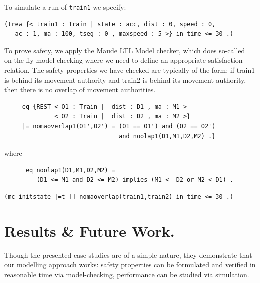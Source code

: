 \documentclass[runningheads,a4paper]{llncs}
\begin{document}
To simulate a run of \texttt{train1} we specify:

\begin{verbatim}
(trew {< train1 : Train | state : acc, dist : 0, speed : 0, 
   ac : 1, ma : 100, tseg : 0 , maxspeed : 5 >} in time <= 30 .)
\end{verbatim}

To prove safety, we apply the Maude LTL Model checker, which does so-called 
on-the-fly model checking where we need to define an appropriate 
satisfaction relation. The safety properties we have checked are typically of the 
form: if train1 is behind its movement authority and train2
is behind its movement authority, then there is no overlap of 
movement authorities. 


\begin{verbatim}
     eq {REST < O1 : Train |  dist : D1 , ma : M1 > 
              < O2 : Train |  dist : D2 , ma : M2 >} 
     |= nomaoverlap1(O1',O2') = (O1 == O1') and (O2 == O2') 
                                and noolap1(D1,M1,D2,M2) .} 
\end{verbatim}

where 

\begin{verbatim}
      eq noolap1(D1,M1,D2,M2) =  
         (D1 <= M1 and D2 <= M2) implies (M1 <  D2 or M2 < D1) .  
\end{verbatim}

\begin{verbatim}
(mc initstate |=t [] nomaoverlap(train1,train2) in time <= 30 .) 
\end{verbatim}

\section{Results \& Future Work.} Though the presented case studies are
of a simple nature, they demonstrate that our modelling approach works:
safety properties can be formulated and verified in reasonable time
via model-checking, performance can be studied via simulation. 

\bigskip
\end{document}
